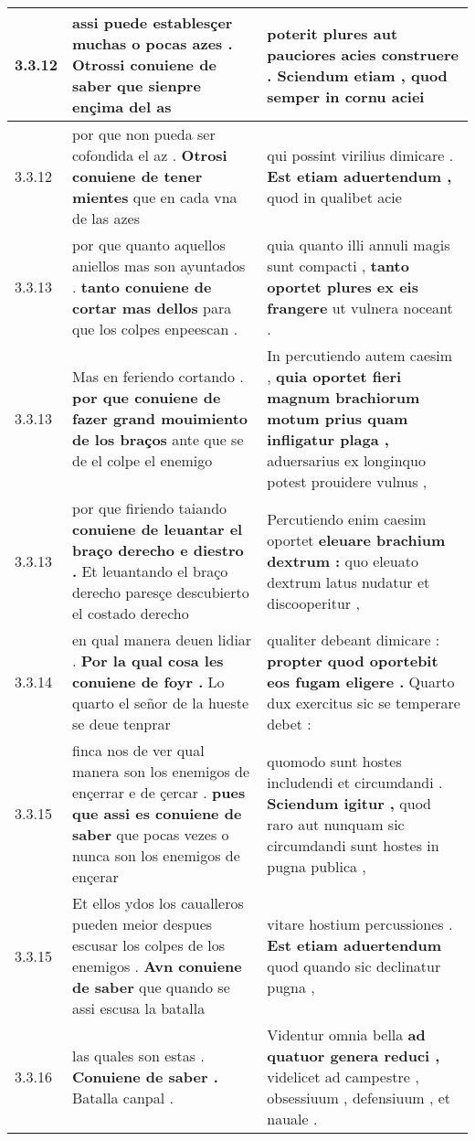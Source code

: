 \begin{tabular}{|p{1cm}|p{6.5cm}|p{6.5cm}|}
3.3.12 & assi puede establesçer muchas o pocas azes . \textbf{ Otrossi conuiene de saber } que sienpre ençima del as & poterit plures aut pauciores acies construere . \textbf{ Sciendum etiam , } quod semper in cornu aciei \\\hline
3.3.12 & por que non pueda ser cofondida el az . \textbf{ Otrosi conuiene de tener mientes } que en cada vna de las azes & qui possint virilius dimicare . \textbf{ Est etiam aduertendum , } quod in qualibet acie \\\hline
3.3.13 & por que quanto aquellos aniellos mas son ayuntados . \textbf{ tanto conuiene de cortar mas dellos } para que los colpes enpeescan . & quia quanto illi annuli magis sunt compacti , \textbf{ tanto oportet plures ex eis frangere } ut vulnera noceant . \\\hline
3.3.13 & Mas en feriendo cortando . \textbf{ por que conuiene de fazer grand mouimiento de los braços } ante que se de el colpe el enemigo & In percutiendo autem caesim , \textbf{ quia oportet fieri magnum brachiorum motum prius quam infligatur plaga , } aduersarius ex longinquo potest prouidere vulnus , \\\hline
3.3.13 & por que firiendo taiando \textbf{ conuiene de leuantar el braço derecho e diestro . } Et leuantando el braço derecho paresçe descubierto el costado derecho & Percutiendo enim caesim oportet \textbf{ eleuare brachium dextrum : } quo eleuato dextrum latus nudatur et discooperitur , \\\hline
3.3.14 & en qual manera deuen lidiar . \textbf{ Por la qual cosa les conuiene de foyr . } Lo quarto el señor de la hueste se deue tenprar & qualiter debeant dimicare : \textbf{ propter quod oportebit eos fugam eligere . } Quarto dux exercitus sic se temperare debet : \\\hline
3.3.15 & finca nos de ver qual manera son los enemigos de ençerrar e de çercar . \textbf{ pues que assi es conuiene de saber } que pocas vezes o nunca son los enemigos de ençerar & quomodo sunt hostes includendi et circumdandi . \textbf{ Sciendum igitur , } quod raro aut nunquam sic circumdandi sunt hostes in pugna publica , \\\hline
3.3.15 & Et ellos ydos los caualleros pueden meior despues escusar los colpes de los enemigos . \textbf{ Avn conuiene de saber } que quando se assi escusa la batalla & vitare hostium percussiones . \textbf{ Est etiam aduertendum } quod quando sic declinatur pugna , \\\hline
3.3.16 & las quales son estas . \textbf{ Conuiene de saber . } Batalla canpal . & Videntur omnia bella \textbf{ ad quatuor genera reduci , } videlicet ad campestre , obsessiuum , defensiuum , et nauale . \\\hline

\end{tabular}
